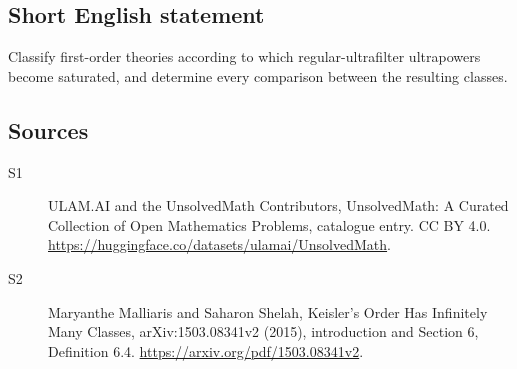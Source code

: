 \documentclass[11pt]{article}
\begin{document}
\subsection{Short English statement}
Classify first-order theories according to which regular-ultrafilter ultrapowers become saturated, and determine every comparison between the resulting classes.
\subsection{Sources}
\begin{description}
\item[\hypertarget{source:statement:1}{S1}] ULAM.AI and the UnsolvedMath Contributors, UnsolvedMath: A Curated Collection of Open Mathematics Problems, catalogue entry. CC BY 4.0. \url{https://huggingface.co/datasets/ulamai/UnsolvedMath}.
\item[\hypertarget{source:statement:2}{S2}] Maryanthe Malliaris and Saharon Shelah, Keisler’s Order Has Infinitely Many Classes, arXiv:1503.08341v2 (2015), introduction and Section 6, Definition 6.4. \url{https://arxiv.org/pdf/1503.08341v2}.
\end{description}
\label{end:statement}
\end{document}
